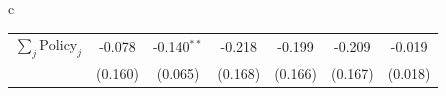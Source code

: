 \documentclass{beamer}
\def\bcolor{\color{forestgreen(web)}}
\def\pcolor{\color{blue}}
\renewcommand{\to}{{\rightarrow}}
\begin{document}
\begin{frame}
\begin{table}
\begin{minipage}{\linewidth}
\begin{tabular}{c}
\begin{tabular}{lccc|c|c|c}
$\sum_j \mathrm{Policy}_j$ & -0.078 & -0.140$^{**}$ & -0.218 & -0.199 & -0.209 & -0.019\\
 & (0.160) & (0.065) & (0.168) & (0.166) & (0.167) & (0.018)\\
\bottomrule
\end{tabular}     \\
  \end{tabular}

\end{minipage}
\end{table}
\end{frame}
\end{document}
